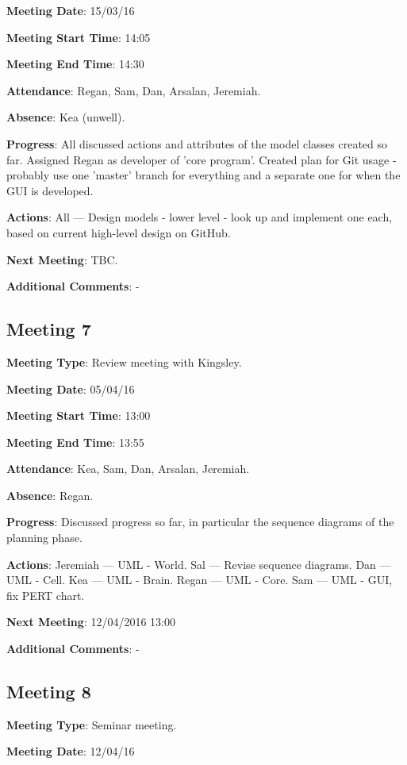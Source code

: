\documentclass[11pt]{article}
\begin{document}
\textbf{Meeting Date}: 15/03/16

\textbf{Meeting Start Time}: 14:05

\textbf{Meeting End Time}: 14:30

\textbf{Attendance}: Regan, Sam, Dan, Arsalan, Jeremiah.

\textbf{Absence}: Kea (unwell).

\textbf{Progress}: All discussed actions and attributes of the model classes created so far. Assigned Regan as developer of 'core program'. Created plan for Git usage - probably use one 'master' branch for everything and a separate one for when the GUI is developed.

\textbf{Actions}: All --- Design models - lower level - look up and implement one each, based on current high-level design on GitHub.

\textbf{Next Meeting}: TBC.

\textbf{Additional Comments}: -

\subsection{Meeting 7}

\textbf{Meeting Type}: Review meeting with Kingsley.

\textbf{Meeting Date}: 05/04/16

\textbf{Meeting Start Time}: 13:00

\textbf{Meeting End Time}: 13:55

\textbf{Attendance}: Kea, Sam, Dan, Arsalan, Jeremiah.

\textbf{Absence}: Regan.

\textbf{Progress}: Discussed progress so far, in particular the sequence diagrams of the planning phase.

\textbf{Actions}: Jeremiah --- UML - World. Sal --- Revise sequence diagrams. Dan --- UML - Cell. Kea --- UML - Brain. Regan --- UML - Core. Sam --- UML - GUI, fix PERT chart.

\textbf{Next Meeting}: 12/04/2016 13:00

\textbf{Additional Comments}: -

\subsection{Meeting 8}

\textbf{Meeting Type}: Seminar meeting.

\textbf{Meeting Date}: 12/04/16
\end{document}
